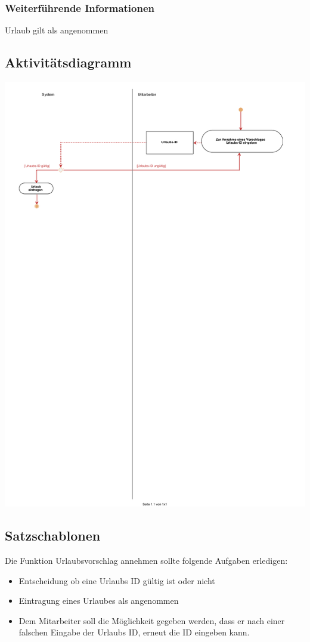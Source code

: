 \subsubsection{Weiterführende Informationen}
Urlaub gilt als angenommen

\subsection{Aktivitätsdiagramm}

\begin{center}
\includegraphics[width=0.9\linewidth]{Urlaubsvorschlag_annehmen.pdf}
\end{center}

\subsection{Satzschablonen}
Die Funktion Urlaubsvorschlag annehmen sollte folgende Aufgaben erledigen:
\begin{itemize}
	\item Entscheidung ob eine Urlaubs ID gültig ist oder nicht
	\item Eintragung eines Urlaubes als angenommen
	\item Dem Mitarbeiter soll die Möglichkeit gegeben werden, dass er nach einer falschen Eingabe der Urlaubs ID, erneut die ID eingeben kann.
\end{itemize}

